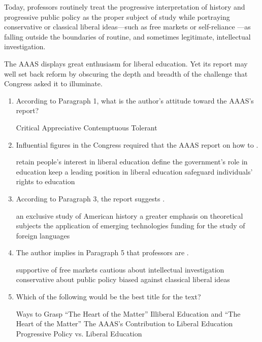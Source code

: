 Today, professors routinely treat the progressive interpretation of
history and progressive public policy as the proper subject of study
while portraying conservative or classical liberal ideas---such as free
markets or self-reliance ---as falling outside the boundaries of
routine, and sometimes legitimate, intellectual investigation.

The AAAS displays great enthusiasm for liberal education. Yet its
report may well set back reform by obscuring the depth and breadth of
the challenge that Congress asked it to illuminate.

\begin{enumerate}[resume]
	\item
According to Paragraph 1, what is the author's attitude toward the AAAS's report?



\fourchoices
{Critical}
{Appreciative}
{Contemptuous}
{Tolerant}



\item
Influential figures in the Congress required that the AAAS
report on how to \lineread.


\fourchoices
{retain people's interest in liberal education}
{define the government's role in education}
{keep a leading position in liberal education}
{safeguard individuals' rights to education}

\item
 According to Paragraph 3, the report suggests \lineread.


\fourchoices
{an exclusive study of American history}
{a greater emphasis on theoretical subjects}
{the application of emerging technologies}
{funding for the study of foreign languages}



\item
 The author implies in Paragraph 5 that professors are \lineread.


\fourchoices
{supportive of free markets}
{cautious about intellectual investigation}
{conservative about public policy}
{biased against classical liberal ideas}




\item
 Which of the following would be the best title for the
text?


\fourchoices
{Ways to Grasp ``The Heart of the Matter''}
{Illiberal Education and ``The Heart of the Matter''}
{The AAAS's Contribution to Liberal Education}
{Progressive Policy vs. Liberal Education}



\end{enumerate}


